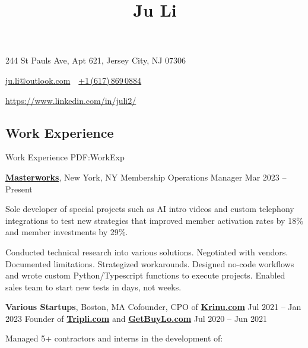 \documentclass[letterpaper,10pt,oneside]{article}
\newcommand{\CVAuthor}{Ju Li}
\begin{document}

\title{\CVAuthor}

\begin{subtitle}
\vspace{1em}
244 St Pauls Ave, Apt 621, Jersey City, NJ 07306
\par
\href{mailto:ju.li@outlook.com}{ju.li@outlook.com}
\,\SubBulletSymbol\,
\href{tel:16178690884}{+1\,(617)\,869\,0884}
\par 
\href{https://www.linkedin.com/in/juli2/}{https://www.linkedin.com/in/juli2/}
\end{subtitle}

\begin{body}


\section
{Work\newline
Experience}
{Work Experience}
{PDF:WorkExp}

\href{https://www.masterworks.com/}
{\textbf{Masterworks}},
New York, NY
\GapNoBreak
Membership Operations Manager
\hfill
Mar 2023 -- Present
\begin{flushleft}

\BulletItem Sole developer of special projects such as AI intro videos and custom telephony integrations to test new strategies that improved member activation rates by 18\% and member investments by 29\%. 

\vspace{0.3em} \BulletItem Conducted technical research into various solutions. Negotiated with vendors. Documented limitations. Strategized workarounds. Designed no-code workflows and wrote custom Python/Typescript functions to execute projects. Enabled sales team to start new tests in days, not weeks.

\end{flushleft}

\textbf{Various Startups},
Boston, MA
\GapNoBreak
Cofounder, CPO of \href{https://krinu.com/}{\textbf{Krinu.com}}
\hfill
Jul 2021 -- Jan 2023
\GapNoBreak
Founder of \href{https://tripli.com/}{\textbf{Tripli.com}} and \href{https://getbuylo.com/}{\textbf{GetBuyLo.com}}
\hfill
Jul 2020 -- Jun 2021
\begin{flushleft}

\BulletItem Managed 5+ contractors and interns in the development of:


\end{flushleft}
\end{body}
\end{document}

